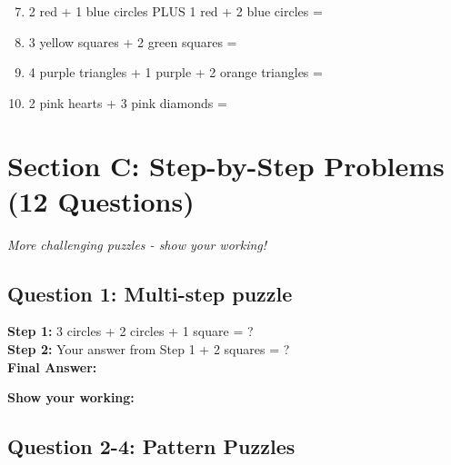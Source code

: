 \documentclass{article}
\begin{document}
\begin{enumerate}
    \setcounter{enumi}{6}
    \item 2 red + 1 blue circles PLUS 1 red + 2 blue circles = \underline{\hspace{5cm}}
    \item 3 yellow squares + 2 green squares = \underline{\hspace{5cm}}
    \item 4 purple triangles + 1 purple + 2 orange triangles = \underline{\hspace{5cm}}
    \item 2 pink hearts + 3 pink diamonds = \underline{\hspace{5cm}}
\end{enumerate}

\section{Section C: Step-by-Step Problems (12 Questions)}
\textit{More challenging puzzles - show your working!}

\subsection*{Question 1: Multi-step puzzle}
\begin{center}
\textbf{Step 1:} 3 circles + 2 circles + 1 square = ?\\
\textbf{Step 2:} Your answer from Step 1 + 2 squares = ?\\
\textbf{Final Answer:} \underline{\hspace{4cm}}
\end{center}

\textbf{Show your working:}
\vspace{2cm}

\subsection*{Question 2-4: Pattern Puzzles}
\end{document}
